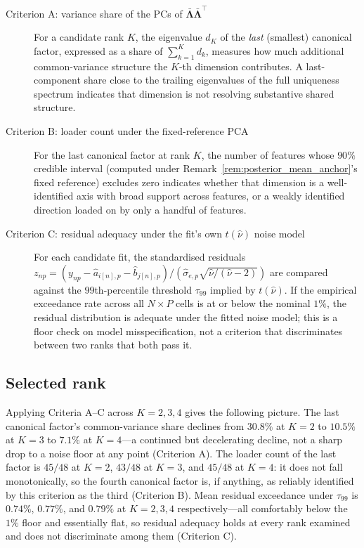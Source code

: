 \begin{description}
\item[Criterion A: variance share of the PCs of $\bar{\boldsymbol{\Lambda}}\bar{\boldsymbol{\Lambda}}^\top$] For a candidate rank $K$, the eigenvalue $d_K$ of the \emph{last} (smallest) canonical factor, expressed as a share of $\sum_{k=1}^K d_k$, measures how much additional common-variance structure the $K$-th dimension contributes. A last-component share close to the trailing eigenvalues of the full uniqueness spectrum indicates that dimension is not resolving substantive shared structure.
\item[Criterion B: loader count under the fixed-reference PCA] For the last canonical factor at rank $K$, the number of features whose $90\%$ credible interval (computed under Remark~\ref{rem:posterior_mean_anchor}'s fixed reference) excludes zero indicates whether that dimension is a well-identified axis with broad support across features, or a weakly identified direction loaded on by only a handful of features.
\item[Criterion C: residual adequacy under the fit's own $t(\hat\nu)$ noise model] For each candidate fit, the standardised residuals $z_{np} = (y_{np} - \hat a_{i[n],p} - \hat b_{j[n],p})/(\hat\sigma_{e,p}\sqrt{\hat\nu/(\hat\nu-2)})$ are compared against the $99$th-percentile threshold $\tau_{99}$ implied by $t(\hat\nu)$. If the empirical exceedance rate across all $N \times P$ cells is at or below the nominal $1\%$, the residual distribution is adequate under the fitted noise model; this is a floor check on model misspecification, not a criterion that discriminates between two ranks that both pass it.
\end{description}

\subsection{Selected rank}
\label{sec:rank_selection}

Applying Criteria A--C across $K=2, 3, 4$ gives the following picture. The last canonical factor's common-variance share declines from $30.8\%$ at $K=2$ to $10.5\%$ at $K=3$ to $7.1\%$ at $K=4$---a continued but decelerating decline, not a sharp drop to a noise floor at any point (Criterion A). The loader count of the last factor is $45/48$ at $K=2$, $43/48$ at $K=3$, and $45/48$ at $K=4$: it does not fall monotonically, so the fourth canonical factor is, if anything, as reliably identified by this criterion as the third (Criterion B). Mean residual exceedance under $\tau_{99}$ is $0.74\%$, $0.77\%$, and $0.79\%$ at $K=2,3,4$ respectively---all comfortably below the $1\%$ floor and essentially flat, so residual adequacy holds at every rank examined and does not discriminate among them (Criterion C).

